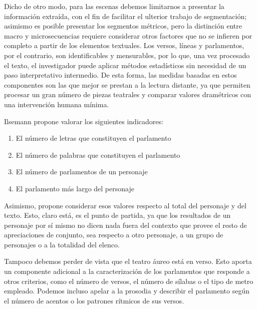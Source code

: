 Dicho de otro modo, para las escenas debemos limitarnos a presentar la información extraída, con el fin de facilitar el ulterior trabajo de segmentación; asimismo es posible presentar los segmentos métricos, pero la distinción entre macro y microsecuencias requiere considerar otros factores que no se infieren por completo a partir de los elementos textuales. Los versos, líneas y parlamentos, por el contrario, son identificables y mensurables, por lo que, una vez procesado el texto, el investigador puede aplicar métodos estadísticos sin necesidad de un paso interpretativo intermedio. De esta forma, las medidas basadas en estos componentes son las que mejor se prestan a la lectura distante, ya que permiten procesar un gran número de piezas teatrales y comparar valores dramétricos con una intervención humana mínima.

Ilsemann propone valorar los siguientes indicadores:
\begin{enumerate}
	\item El número de letras que constituyen el parlamento
	\item El número de palabras que constituyen el parlamento
	\item El número de parlamentos de un personaje
	\item El parlamento más largo del personaje
\end{enumerate}

Asimismo, propone considerar esos valores respecto al total del personaje y del texto. Esto, claro está, es el punto de partida, ya que los resultados de un personaje por sí mismo no dicen nada fuera del contexto que provee el resto de apreciaciones de conjunto, sea respecto a otro personaje, a un grupo de personajes o a la totalidad del elenco.

Tampoco debemos perder de vista que el teatro áureo está en verso. Esto aporta un componente adicional a la caracterización de los parlamentos que responde a otros criterios, como el número de versos, el número de sílabas o el tipo de metro empleado. Podemos incluso apelar a la prosodia y describir el parlamento según el número de acentos o los patrones rítmicos de sus versos.

